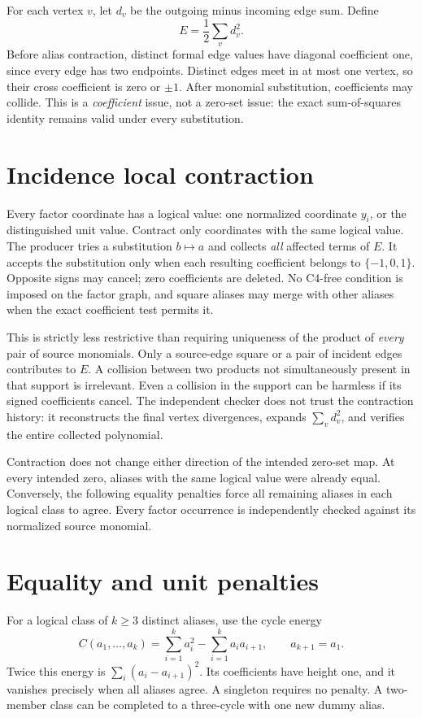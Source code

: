 For each vertex \(v\), let \(d_v\) be the outgoing minus incoming edge
sum. Define
\[
 E=\frac12\sum_v d_v^2.
\]
Before alias contraction, distinct formal edge values have diagonal
coefficient one, since every edge has two endpoints. Distinct edges meet
in at most one vertex, so their cross coefficient is zero or \(\pm1\).
After monomial substitution, coefficients may collide. This is a
\emph{coefficient} issue, not a zero-set issue: the exact sum-of-squares
identity remains valid under every substitution.

\section{Incidence local contraction}
Every factor coordinate has a logical value: one normalized coordinate
\(y_i\), or the distinguished unit value. Contract only coordinates with
the same logical value. The producer tries a substitution \(b\mapsto a\)
and collects \emph{all} affected terms of \(E\). It accepts the substitution
only when each resulting coefficient belongs to \(\{-1,0,1\}\).
Opposite signs may cancel; zero coefficients are deleted. No C4-free
condition is imposed on the factor graph, and square aliases may merge
with other aliases when the exact coefficient test permits it.

This is strictly less restrictive than requiring uniqueness of the
product of \emph{every} pair of source monomials. Only a source-edge
square or a pair of incident edges contributes to \(E\). A collision
between two products not simultaneously present in that support is
irrelevant. Even a collision in the support can be harmless if its signed
coefficients cancel. The independent checker does not trust the contraction
history: it reconstructs the final vertex divergences, expands
\(\sum_vd_v^2\), and verifies the entire collected polynomial.

Contraction does not change either direction of the intended zero-set
map. At every intended zero, aliases with the same logical value were
already equal. Conversely, the following equality penalties force all
remaining aliases in each logical class to agree. Every factor occurrence
is independently checked against its normalized source monomial.

\section{Equality and unit penalties}
For a logical class of \(k\geq3\) distinct aliases, use the cycle energy
\[
 C(a_1,\ldots,a_k)=\sum_{i=1}^k a_i^2-
                  \sum_{i=1}^k a_i a_{i+1},\qquad a_{k+1}=a_1.
\]
Twice this energy is \(\sum_i(a_i-a_{i+1})^2\). Its coefficients have
height one, and it vanishes precisely when all aliases agree. A singleton
requires no penalty. A two-member class can be completed to a three-cycle
with one new dummy alias.

